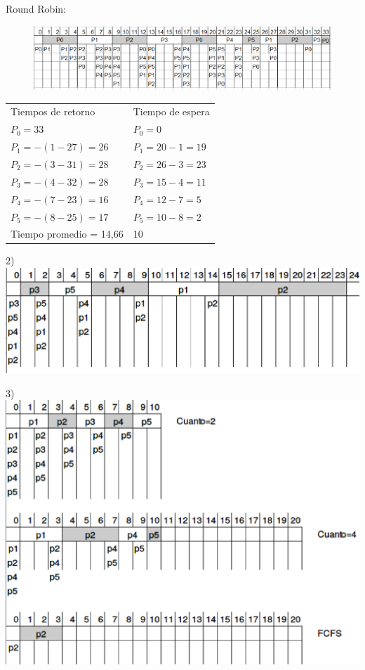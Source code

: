 \documentclass[a4paper]{article}
\begin{document}
Round Robin:\\
\begin{figure}[!htb]
\includegraphics[scale=0.60]{Round-Robin.eps}
\end{figure}
\begin{tabular}{l l}
Tiempos de retorno 		& Tiempo de espera\\
$P_0 = 33$   		 	& $P_0 = 0$ \\
$P_1 =-(1 - 27)= 26$ 	& $P_1 = 20-1= 19$ \\
$P_2 =-(3 - 31)= 28$ 	& $P_2 = 26-3= 23$\\
$P_3 =-(4 - 32)= 28$ 	& $P_3 = 15-4= 11$\\
$P_4 =-(7 - 23)= 16$ 	& $P_4 = 12-7= 5$\\
$P_5 =-(8 - 25)= 17$ 	& $P_5 = 10-8= 2$\\
Tiempo promedio = 14,66 & 10
\end{tabular}

2)\\
\includegraphics[scale=0.5]{Ejercicio-2.eps}

3)\\
\includegraphics[scale=0.5]{Ejercicio-3.eps}
\end{document}
